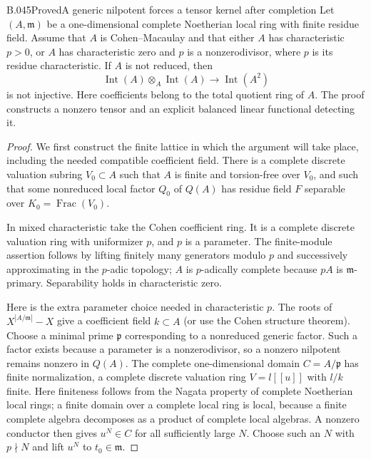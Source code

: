 \begin{saresult}{B.045}{Proved}{A generic nilpotent forces a tensor kernel after completion}
Let $(A,\mathfrak m)$ be a one-dimensional complete
Noetherian local ring with finite residue field. Assume that
$A$ is Cohen--Macaulay and that either $A$ has characteristic
$p>0$, or $A$ has characteristic zero and $p$ is a
nonzerodivisor, where $p$ is its residue characteristic.
If $A$ is not reduced, then
\[
 \operatorname{Int}(A)\otimes_A\operatorname{Int}(A)
       \longrightarrow\operatorname{Int}(A^2)
\]
is not injective. Here coefficients belong to the total
quotient ring of $A$. The proof constructs a nonzero tensor
and an explicit balanced linear functional detecting it.
\end{saresult}
\begin{proof}
We first construct the finite lattice in which the argument
will take place, including the needed compatible coefficient
field. There is a complete discrete valuation subring
$V_0\subset A$ such that $A$ is finite and torsion-free over
$V_0$, and such that some nonreduced local factor $Q_0$ of
$Q(A)$ has residue field $F$ separable over
$K_0=\operatorname{Frac}(V_0)$.

In mixed characteristic take the Cohen coefficient ring.
It is a complete discrete valuation ring with uniformizer
$p$, and $p$ is a parameter. The finite-module assertion
follows by lifting finitely many generators modulo $p$ and
successively approximating in the $p$-adic topology;
$A$ is $p$-adically complete because $pA$ is
$\mathfrak m$-primary. Separability holds in characteristic
zero.

Here is the extra parameter choice needed in characteristic
$p$. The roots of $X^{|A/\mathfrak m|}-X$ give a coefficient
field $k\subset A$ (or use the Cohen structure theorem).
Choose a minimal prime $\mathfrak p$ corresponding to a
nonreduced generic factor. Such a factor exists because a
parameter is a nonzerodivisor, so a nonzero nilpotent remains
nonzero in $Q(A)$. The complete one-dimensional domain
$C=A/\mathfrak p$ has finite normalization, a complete
discrete valuation ring $V=l[[u]]$ with $l/k$ finite.
Here finiteness follows from the Nagata property of complete
Noetherian local rings; a finite domain over a complete local
ring is local, because a finite complete algebra decomposes
as a product of complete local algebras. A nonzero conductor
then gives $u^N\in C$ for all sufficiently large $N$.
Choose such an $N$ with $p\nmid N$ and lift $u^N$ to
$t_0\in\mathfrak m$.


\end{proof}
